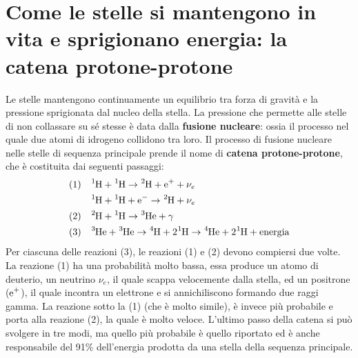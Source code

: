\documentclass[a4paper, oneside]{book}
\begin{document}
\section{Come le stelle si mantengono in vita e sprigionano energia: la catena protone-protone}
Le stelle mantengono continuamente un equilibrio tra forza di gravità e la pressione
sprigionata dal nucleo della stella. La pressione che permette alle stelle di non collassare
su sé stesse è data dalla \textbf{fusione nucleare}: ossia il processo nel quale
due atomi di idrogeno collidono tra loro. Il processo di fusione nucleare nelle stelle 
di sequenza principale prende il nome di \textbf{catena protone-protone}, che è costituita
dai seguenti passaggi:
\begin{align*}
    (1)& \quad  \ce{^{1}H} + \ce{^{1}H} \to \ce{^{2}H} + \ce{e+} + \nu_e \\
       & \quad  \ce{^{1}H} + \ce{^{1}H} + \ce{e-} \to \ce{^{2}H} + \nu_e \\
    (2)& \quad \ce{^{2}H} + \ce{^{1}H} \to \ce{^{3}He} + \gamma \\
    (3)& \quad  \ce{^{3}He} + \ce{^{3}He} \to \ce{^{4}H} + 2\ce{^{1}H} \to \ce{^{4}He} + 2\ce{^{1}H} + \text{energia}
\end{align*}
Per ciascuna delle reazioni (3), le reazioni (1) e (2) devono compiersi due volte. 
La reazione (1) ha una probabilità molto bassa, essa produce un atomo di deuterio, un neutrino $\nu_e$, il quale scappa velocemente dalla stella,
ed un positrone ($\ce{e+}$), il quale incontra un elettrone e si 
annichiliscono formando due raggi gamma. La reazione sotto la (1) (che è molto simile), 
è invece più probabile e porta alla reazione (2), la quale è molto veloce. L'ultimo passo della catena
si può svolgere in tre modi, ma quello più probabile è quello riportato ed è anche
responsabile del 91\% dell'energia prodotta da una stella della sequenza principale.  
\end{document}
